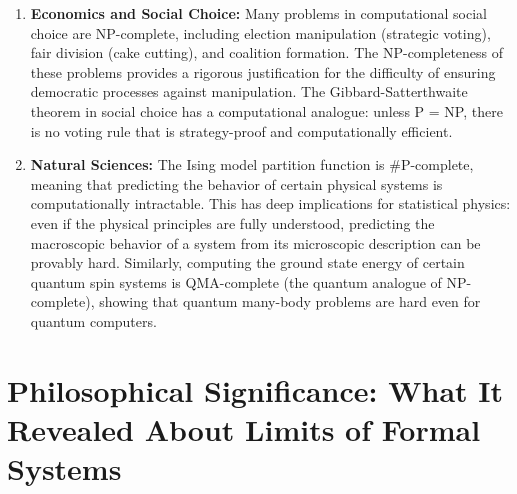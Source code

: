 \begin{enumerate}
\item \textbf{Economics and Social Choice:} Many problems in computational social choice are NP-complete, including election manipulation (strategic voting), fair division (cake cutting), and coalition formation. The NP-completeness of these problems provides a rigorous justification for the difficulty of ensuring democratic processes against manipulation. The Gibbard-Satterthwaite theorem in social choice has a computational analogue: unless P = NP, there is no voting rule that is strategy-proof and computationally efficient.

\item \textbf{Natural Sciences:} The Ising model partition function is \#P-complete, meaning that predicting the behavior of certain physical systems is computationally intractable. This has deep implications for statistical physics: even if the physical principles are fully understood, predicting the macroscopic behavior of a system from its microscopic description can be provably hard. Similarly, computing the ground state energy of certain quantum spin systems is QMA-complete (the quantum analogue of NP-complete), showing that quantum many-body problems are hard even for quantum computers.
\end{enumerate}

\section{Philosophical Significance: What It Revealed About Limits of Formal Systems}
\label{sec:np:philosophy}

